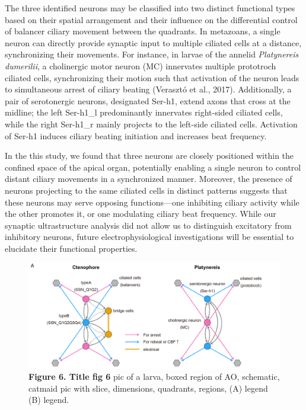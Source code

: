 \documentclass[
  11pt,
]{article}
\begin{document}
The three identified neurons may be classified into two distinct
functional types based on their spatial arrangement and their influence
on the differential control of balancer ciliary movement between the
quadrants. In metazoans, a single neuron can directly provide synaptic
input to multiple ciliated cells at a distance, synchronizing their
movements. For instance, in larvae of the annelid \emph{Platynereis
dumerilii}, a cholinergic motor neuron (MC) innervates multiple
prototroch ciliated cells, synchronizing their motion such that
activation of the neuron leads to simultaneous arrest of ciliary beating
(Verasztó et al., 2017). Additionally, a pair of serotonergic neurons,
designated Ser-h1, extend axons that cross at the midline; the left
Ser-h1\_l predominantly innervates right-sided ciliated cells, while the
right Ser-h1\_r mainly projects to the left-side ciliated cells.
Activation of Ser-h1 induces ciliary beating initiation and increases
beat frequency.

In the this study, we found that three neurons are closely positioned
within the confined space of the apical organ, potentially enabling a
single neuron to control distant ciliary movements in a synchronized
manner. Moreover, the presence of neurons projecting to the same
ciliated cells in distinct patterns suggests that these neurons may
serve opposing functions---one inhibiting ciliary activity while the
other promotes it, or one modulating ciliary beat frequency. While our
synaptic ultrastructure analysis did not allow us to distinguish
excitatory from inhibitory neurons, future electrophysiological
investigations will be essential to elucidate their functional
properties.

\begin{figure}[H]

{\centering \includegraphics[width=1\textwidth,height=\textheight]{figures/Figure6.png}

}

\caption{\textbf{Figure 6. Title fig 6} pic of a larva, boxed region of
AO, schematic, catmaid pic with slice, dimensions, quadrants, regions,
(A) legend (B) legend.}

\end{figure}%
\end{document}
